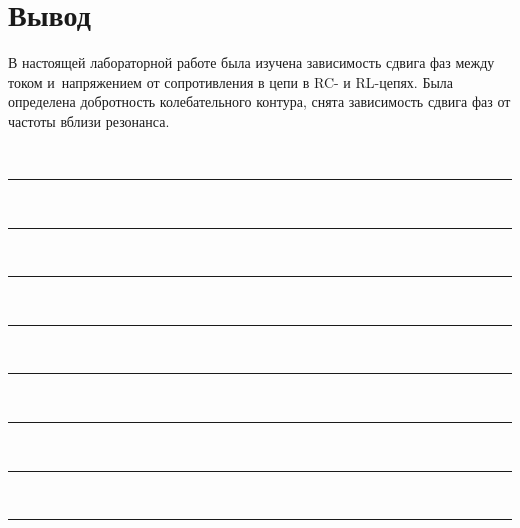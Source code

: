 \documentclass{physlab}
\begin{document}
\section{Вывод}

В настоящей лабораторной работе была изучена зависимость сдвига фаз между током и~напряжением от сопротивления в цепи в RC- и RL-цепях. Была определена добротность колебательного контура, снята зависимость сдвига фаз от частоты вблизи резонанса.

~\\[-1ex]\hrule~\\[1ex]\hrule~\\[1ex]\hrule~\\[1ex]\hrule~\\[1ex]\hrule~\\[1ex]\hrule~\\[1ex]\hrule~\\[1ex]\hrule
\end{document}
